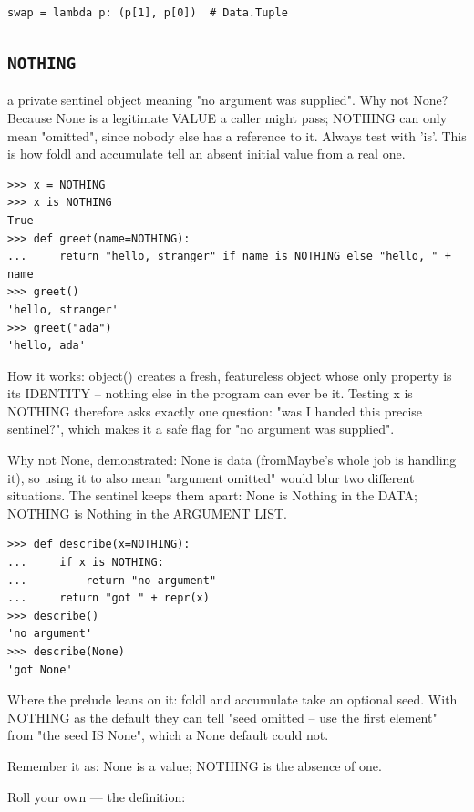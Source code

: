 \documentclass[10pt,letterpaper]{book}
\begin{document}
\begin{lstlisting}[style=ex]
swap = lambda p: (p[1], p[0])  # Data.Tuple
\end{lstlisting}

\subsection{\texttt{NOTHING}}\label{def:NOTHING}
a private sentinel object meaning "no argument was supplied". Why not None? Because None is a legitimate VALUE a caller might pass; NOTHING can only mean "omitted", since nobody else has a reference to it. Always test with 'is'. This is how foldl and accumulate tell an absent initial value from a real one.
\begin{lstlisting}[style=ex]
>>> x = NOTHING
>>> x is NOTHING
True
>>> def greet(name=NOTHING):
...     return "hello, stranger" if name is NOTHING else "hello, " + name
>>> greet()
'hello, stranger'
>>> greet("ada")
'hello, ada'
\end{lstlisting}

How it works: object() creates a fresh, featureless object whose only property is its IDENTITY -- nothing else in the program can ever be it. Testing x is NOTHING therefore asks exactly one question: "was I handed this precise sentinel?", which makes it a safe flag for "no argument was supplied".


Why not None, demonstrated: None is data (fromMaybe's whole job is handling it), so using it to also mean "argument omitted" would blur two different situations. The sentinel keeps them apart: None is Nothing in the DATA; NOTHING is Nothing in the ARGUMENT LIST.

\begin{lstlisting}[style=ex]
>>> def describe(x=NOTHING):
...     if x is NOTHING:
...         return "no argument"
...     return "got " + repr(x)
>>> describe()
'no argument'
>>> describe(None)
'got None'
\end{lstlisting}

Where the prelude leans on it: foldl and accumulate take an optional seed. With NOTHING as the default they can tell "seed omitted -- use the first element" from "the seed IS None", which a None default could not.


Remember it as: None is a value; NOTHING is the absence of one.


Roll your own --- the definition:
\end{document}
